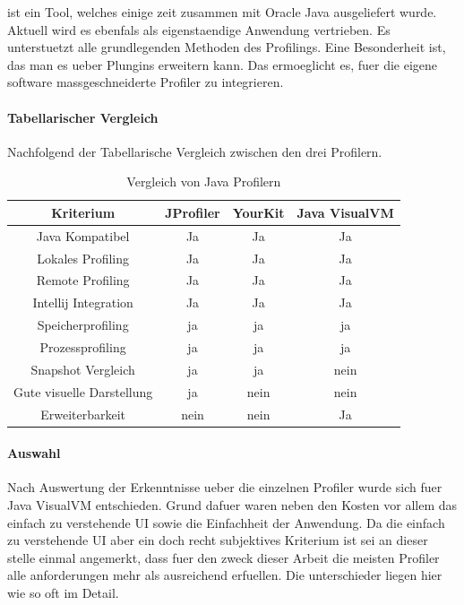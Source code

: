 \documentclass{article}
\begin{document}
ist ein Tool, welches einige zeit zusammen mit Oracle Java ausgeliefert wurde. ~\cite{WEBSITE:5} Aktuell wird es ebenfals als eigenstaendige Anwendung vertrieben. Es unterstuetzt alle grundlegenden Methoden des Profilings. Eine Besonderheit ist, das man es ueber Plungins erweitern kann. Das ermoeglicht es, fuer die eigene software massgeschneiderte Profiler zu integrieren.  

\paragraph{Tabellarischer Vergleich}

Nachfolgend der Tabellarische Vergleich zwischen den drei Profilern. 
\begin{table}[h]
  \centering
  \caption{Vergleich von Java Profilern}
  \begin{tabular}{cccc}
    Kriterium & JProfiler & YourKit & Java VisualVM\\
    \hline
    Java Kompatibel & Ja& Ja & Ja\\
    Lokales Profiling &Ja&Ja&Ja\\
    Remote Profiling&Ja&Ja&Ja\\
    Intellij Integration&Ja&Ja&Ja\\
    Speicherprofiling&ja&ja&ja\\
    Prozessprofiling&ja&ja&ja\\
    Snapshot Vergleich&ja&ja&nein\\
    Gute visuelle Darstellung &ja&nein&nein\\
    Erweiterbarkeit&nein&nein&Ja
  \end{tabular}
  \label{tab:1}
\end{table}

\paragraph{Auswahl}
Nach Auswertung der Erkenntnisse ueber die einzelnen Profiler wurde sich fuer Java VisualVM entschieden.  Grund dafuer waren neben den Kosten vor allem das einfach zu verstehende UI sowie die Einfachheit der Anwendung. Da die einfach zu verstehende UI aber ein doch recht subjektives Kriterium ist sei an dieser stelle einmal angemerkt, dass fuer den zweck  dieser Arbeit die meisten Profiler alle anforderungen mehr als ausreichend erfuellen. Die unterschieder liegen hier wie so oft im Detail. 
\end{document}
